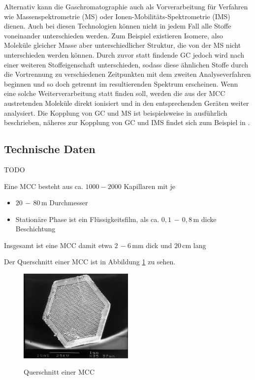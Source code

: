 Alternativ kann die Gaschromatographie auch als Vorverarbeitung für Verfahren wie Massenspektrometrie (MS) oder Ionen-Mobilitäts-Spektrometrie (IMS) dienen. Auch bei diesen Technologien können nicht in jedem Fall alle Stoffe voneinander unterschieden werden. Zum Beispiel existieren Isomere, also Moleküle gleicher Masse aber unterschiedlicher Struktur, die von der MS nicht unterschieden werden können. Durch zuvor statt findende GC jedoch wird nach einer weiteren Stoffeigenschaft unterschieden, sodass diese ähnlichen Stoffe durch die Vortrennung zu verschiedenen Zeitpunkten mit dem zweiten Analyseverfahren beginnen und so doch getrennt im resultierenden Spektrum erscheinen. Wenn eine solche Weiterverarbeitung statt finden soll, werden die aus der MCC austretenden Moleküle direkt ionisiert und in den entsprechenden Geräten weiter analysiert.
Die Kopplung von GC und MS ist beispielsweise in \cite{Hubschmann2009} ausführlich beschrieben, näheres zur Kopplung von GC und IMS findet sich zum Beispiel in \cite{Baumbach2009}. 


\subsection{Technische Daten}
TODO

Eine MCC besteht aus ca. $1000 - 2000$ Kapillaren mit je
\begin{itemize}
 \item $20\,-\,80$\,\textmu m Durchmesser
 \item Stationäre Phase ist ein Flüssigkeitsfilm, als ca. $0,1\,-\,0,8$\,\textmu m dicke Beschichtung
\end{itemize}
Insgesamt ist eine MCC damit etwa $2\,-6$\,mm dick und $20$\,cm lang


Der Querschnitt einer MCC ist in Abbildung \ref{MCC} zu sehen.

\begin{figure}
 \centering
  \includegraphics[width = 0.5\textwidth]{bilder/MultiCapillaryColumn}\\
  \caption[Querschnitt einer MCC]{Querschnitt einer MCC \protect\footnotemark}
  \label{MCC}
\end{figure}

